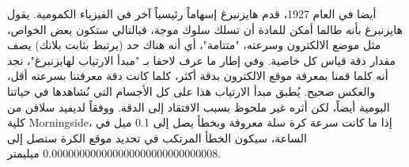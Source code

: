 أيضا في العام 1927، قدم هايزنبرغ إسهاماً رئيسياً آخر في الفيزياء الكمومية. يقول هايزنبرغ بأنه طالما أمكن للمادة أن تسلك سلوك موجة، فبالتالي ستكون بعض الخواص، مثل موضع الالكترون وسرعته، "متتامة"، أي أنه هناك حد (يرتبط بثابت بلانك) يصف مقدار دقة قياس كل خاصية. وفي إطار ما عرف لاحقا بـ "مبدأ الارتياب لهايزنبرغ"، نجد أنه كلما قمنا بمعرفة موقع الالكترون بدقة أكثر، كلما كانت دقة معرفتنا بسرعته أقل، والعكس صحيح. يُطبق مبدأ الارتياب هذا على كل الأجسام التي نُشاهدها في حياتنا اليومية أيضاً، لكن أثره غير ملحوظ بسبب الافتقاد إلى الدقة. ووفقاً لديفيد سلافن من كلية Morningside، إذا ما كانت سرعة كرة سلة معروفة وبخطأ يصل إلى 0.1 ميل في الساعة، سيكون الخطأ المرتكب في تحديد موقع الكرة ستصل إلى 0.000000000000000000000000000008 ميليمتر. 




